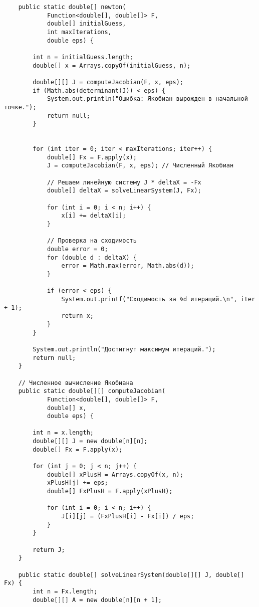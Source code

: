 \begin{verbatim}
    public static double[] newton(
            Function<double[], double[]> F,
            double[] initialGuess,
            int maxIterations,
            double eps) {

        int n = initialGuess.length;
        double[] x = Arrays.copyOf(initialGuess, n);

        double[][] J = computeJacobian(F, x, eps);
        if (Math.abs(determinant(J)) < eps) {
            System.out.println("Ошибка: Якобиан вырожден в начальной точке.");
            return null;
        }


        for (int iter = 0; iter < maxIterations; iter++) {
            double[] Fx = F.apply(x);
            J = computeJacobian(F, x, eps); // Численный Якобиан

            // Решаем линейную систему J * deltaX = -Fx
            double[] deltaX = solveLinearSystem(J, Fx);

            for (int i = 0; i < n; i++) {
                x[i] += deltaX[i];
            }

            // Проверка на сходимость
            double error = 0;
            for (double d : deltaX) {
                error = Math.max(error, Math.abs(d));
            }

            if (error < eps) {
                System.out.printf("Сходимость за %d итераций.\n", iter + 1);
                return x;
            }
        }

        System.out.println("Достигнут максимум итераций.");
        return null;
    }

    // Численное вычисление Якобиана
    public static double[][] computeJacobian(
            Function<double[], double[]> F,
            double[] x,
            double eps) {

        int n = x.length;
        double[][] J = new double[n][n];
        double[] Fx = F.apply(x);

        for (int j = 0; j < n; j++) {
            double[] xPlusH = Arrays.copyOf(x, n);
            xPlusH[j] += eps;
            double[] FxPlusH = F.apply(xPlusH);

            for (int i = 0; i < n; i++) {
                J[i][j] = (FxPlusH[i] - Fx[i]) / eps;
            }
        }

        return J;
    }

    public static double[] solveLinearSystem(double[][] J, double[] Fx) {
        int n = Fx.length;
        double[][] A = new double[n][n + 1];


\end{verbatim}
